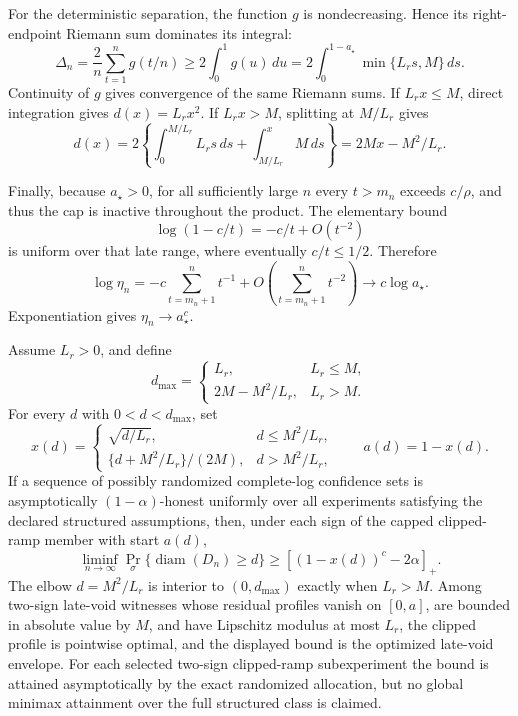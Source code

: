 For the deterministic separation, the function \(g\) is nondecreasing. Hence its right-endpoint Riemann sum dominates its integral:
\[
 \Delta_n=\frac2n\sum_{t=1}^n g(t/n)
 \ge2\int_0^1g(u)\,du
 =2\int_0^{1-a_\star}\min\{L_rs,M\}\,ds.
\]
Continuity of \(g\) gives convergence of the same Riemann sums. If \(L_rx\le M\), direct integration gives \(d(x)=L_rx^2\). If \(L_rx>M\), splitting at \(M/L_r\) gives
\[
 d(x)=2\left\{\int_0^{M/L_r}L_rs\,ds
       +\int_{M/L_r}^xM\,ds\right\}
 =2Mx-M^2/L_r.
\]

Finally, because \(a_\star>0\), for all sufficiently large \(n\) every \(t>m_n\) exceeds \(c/\rho\), and thus the cap is inactive throughout the product. The elementary bound
\[
 \log(1-c/t)=-c/t+O(t^{-2})
\]
is uniform over that late range, where eventually \(c/t\le1/2\). Therefore
\[
 \log\eta_n
 =-c\sum_{t=m_n+1}^n t^{-1}
   +O\!\left(\sum_{t=m_n+1}^nt^{-2}\right)
 \longrightarrow c\log a_\star.
\]
Exponentiation gives \(\eta_n\to a_\star^c\).

Assume \(L_r>0\), and define
\[
 d_{\max}=\begin{cases}
 L_r,&L_r\le M,\\
 2M-M^2/L_r,&L_r>M.
 \end{cases}
\]
For every \(d\) with \(0<d<d_{\max}\), set
\[
 x(d)=\begin{cases}
 \sqrt{d/L_r},&d\le M^2/L_r,\\
 \{d+M^2/L_r\}/(2M),&d>M^2/L_r,
 \end{cases}
 \qquad a(d)=1-x(d).
\]
If a sequence of possibly randomized complete-log confidence sets is asymptotically \((1-\alpha)\)-honest uniformly over all experiments satisfying the declared structured assumptions, then, under each sign of the capped clipped-ramp member with start \(a(d)\),
\[
 \liminf_{n\to\infty}
 \Pr_\sigma\{\operatorname{diam}(D_n)\ge d\}
 \ge[(1-x(d))^c-2\alpha]_+.
\]
The elbow \(d=M^2/L_r\) is interior to \((0,d_{\max})\) exactly when \(L_r>M\). Among two-sign late-void witnesses whose residual profiles vanish on \([0,a]\), are bounded in absolute value by \(M\), and have Lipschitz modulus at most \(L_r\), the clipped profile is pointwise optimal, and the displayed bound is the optimized late-void envelope. For each selected two-sign clipped-ramp subexperiment the bound is attained asymptotically by the exact randomized allocation, but no global minimax attainment over the full structured class is claimed.

